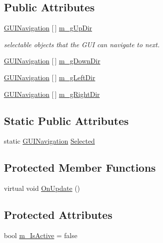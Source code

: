 \subsection*{Public Attributes}
\begin{DoxyCompactItemize}
\item 
\mbox{\hyperlink{class_g_u_i_navigation}{G\+U\+I\+Navigation}} \mbox{[}$\,$\mbox{]} \mbox{\hyperlink{class_g_u_i_navigation_a2d9fe7f1821eadf1c04e35466a03bd37}{m\+\_\+g\+Up\+Dir}}
\begin{DoxyCompactList}\small\item\em selectable objects that the G\+UI can navigate to next. \end{DoxyCompactList}\item 
\mbox{\hyperlink{class_g_u_i_navigation}{G\+U\+I\+Navigation}} \mbox{[}$\,$\mbox{]} \mbox{\hyperlink{class_g_u_i_navigation_ac3372b8affb924a8468bd927749863e8}{m\+\_\+g\+Down\+Dir}}
\item 
\mbox{\hyperlink{class_g_u_i_navigation}{G\+U\+I\+Navigation}} \mbox{[}$\,$\mbox{]} \mbox{\hyperlink{class_g_u_i_navigation_a77f5e33b6f4b63fa8449558d52e4b238}{m\+\_\+g\+Left\+Dir}}
\item 
\mbox{\hyperlink{class_g_u_i_navigation}{G\+U\+I\+Navigation}} \mbox{[}$\,$\mbox{]} \mbox{\hyperlink{class_g_u_i_navigation_a02840e247382a667a128048125db9160}{m\+\_\+g\+Right\+Dir}}
\end{DoxyCompactItemize}
\subsection*{Static Public Attributes}
\begin{DoxyCompactItemize}
\item 
static \mbox{\hyperlink{class_g_u_i_navigation}{G\+U\+I\+Navigation}} \mbox{\hyperlink{class_g_u_i_navigation_ae0698cb4125a3d26d4e3fe20ae9cbbbf}{Selected}}
\end{DoxyCompactItemize}
\subsection*{Protected Member Functions}
\begin{DoxyCompactItemize}
\item 
virtual void \mbox{\hyperlink{class_g_u_i_navigation_aad668226e400889bceea3914750b949e}{On\+Update}} ()
\end{DoxyCompactItemize}
\subsection*{Protected Attributes}
\begin{DoxyCompactItemize}
\item 
bool \mbox{\hyperlink{class_g_u_i_navigation_a1336705311b4ab26bb121b6d81d6a090}{m\+\_\+\+Is\+Active}} = false
\end{DoxyCompactItemize}


